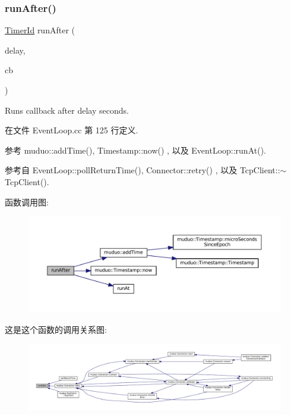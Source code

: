 \subsubsection{\texorpdfstring{run\+After()}{runAfter()}}
{\footnotesize\ttfamily \hyperlink{classmuduo_1_1TimerId}{Timer\+Id} run\+After (\begin{DoxyParamCaption}\item[{double}]{delay,  }\item[{const \hyperlink{namespacemuduo_a5f7453c2a15825e79bddf5deaec707bf}{Timer\+Callback} \&}]{cb }\end{DoxyParamCaption})}

Runs callback after {\ttfamily delay} seconds. 

在文件 Event\+Loop.\+cc 第 125 行定义.



参考 muduo\+::add\+Time(), Timestamp\+::now() , 以及 Event\+Loop\+::run\+At().



参考自 Event\+Loop\+::poll\+Return\+Time(), Connector\+::retry() , 以及 Tcp\+Client\+::$\sim$\+Tcp\+Client().

函数调用图\+:
\nopagebreak
\begin{figure}[H]
\begin{center}
\leavevmode
\includegraphics[width=350pt]{classmuduo_1_1EventLoop_ae770f8cb708dfacf455d71d6977e5436_cgraph}
\end{center}
\end{figure}
这是这个函数的调用关系图\+:
\nopagebreak
\begin{figure}[H]
\begin{center}
\leavevmode
\includegraphics[width=350pt]{classmuduo_1_1EventLoop_ae770f8cb708dfacf455d71d6977e5436_icgraph}
\end{center}
\end{figure}
\mbox{\label{classmuduo_1_1EventLoop_aa4a2472f0030a6f2076aa56e21830f6f}} 
